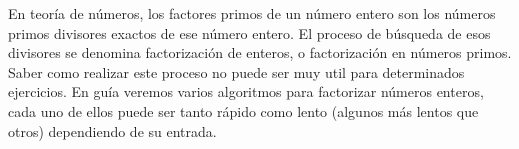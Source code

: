 En teoría de números, los factores primos de un número entero son los números primos divisores exactos de ese número entero. El proceso de búsqueda de esos divisores se denomina factorización de enteros, o factorización en números primos. Saber como realizar este proceso no puede ser muy util para determinados ejercicios. En guía veremos varios algoritmos para factorizar números enteros, cada uno de ellos puede ser tanto rápido como lento (algunos más lentos que otros) dependiendo de su entrada.
